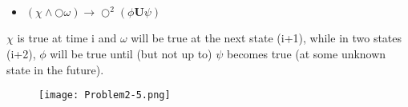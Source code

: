 \subsection{}

\begin{itemize}
   \item[] $(\chi \land \bigcirc \omega) \rightarrow \bigcirc^{2} (\phi \textbf{U} \psi)$ 
\end{itemize}

\noindent $\chi$ is true at time i and $\omega$ will be true at the next state (i+1), while in two states (i+2), 
$\phi$ will be true until (but not up to) $\psi$ becomes true (at some unknown state in the future). 

\begin{figure}[h!]
	\centering \texttt{[image: Problem2-5.png]}
\end{figure}